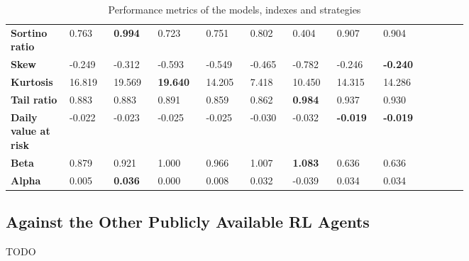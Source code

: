 \documentclass[../xlapes02]{subfiles}
\begin{document}
\begin{table}
{\begin{tabular}{*{10}{|m{0.075\linewidth}|}}
                \bfseries Sortino ratio       & 0.763                             & \color[HTML]{00F000} \bfseries 0.994 & 0.723                                 & 0.751            & 0.802 & 0.404 & 0.907 & 0.904 \\[0.5cm]
                \bfseries Skew                & -0.249                            & -0.312                               & -0.593                                & -0.549           & -0.465           & -0.782                               & -0.246                                & \color[HTML]{00F000} \bfseries -0.240 \\[0.5cm]
                \bfseries Kurtosis            & 16.819                            & 19.569                               & \color[HTML]{00F000} \bfseries 19.640 & 14.205           & 7.418 & 10.450 & 14.315 & 14.286 \\[0.5cm]
                \bfseries Tail ratio          & 0.883                             & 0.883                                & 0.891                                 & 0.859            & 0.862            & \color[HTML]{00F000} \bfseries 0.984 & 0.937 & 0.930 \\[0.5cm]
                \bfseries Daily value at risk & -0.022                            & -0.023                               & -0.025                                & -0.025           & -0.030           & -0.032                               & \color[HTML]{00F000} \bfseries -0.019 & \color[HTML]{00F000} \bfseries -0.019 \\[0.5cm]
                \bfseries Beta                & 0.879                             & 0.921                                & 1.000                                 & 0.966            & 1.007            & \color[HTML]{00F000} \bfseries 1.083 & 0.636 & 0.636 \\[0.5cm]
                \bfseries Alpha               & 0.005                             & \color[HTML]{00F000} \bfseries 0.036 & 0.000                                 & 0.008            & 0.032            & -0.039 & 0.034 & 0.034 \\[0.5cm]
                \bottomrule
            \end{tabular}
        }
        \caption{Performance metrics of the models, indexes and strategies}
        \label{tab:stats}
    \end{table}

    \subsection{Against the Other Publicly Available RL Agents}\label{subsec:against-the-other-publicly-available-rl-agents}
    TODO
\end{document}
